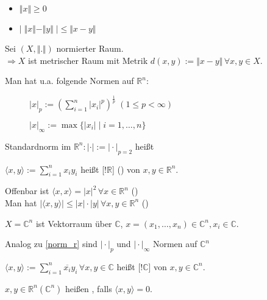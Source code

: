 \begin{conclusion}
	\begin{itemize}
		\item $\Vert x\Vert\ge 0$
		\item $\vert \; \Vert x\Vert - \Vert y\Vert \; \vert \leq \Vert x-y\Vert$
	\end{itemize}
\end{conclusion}

\begin{proposition}
	Sei $(X,\Vert .\Vert)$ normierter Raum.\\
	$\Rightarrow X$ ist metrischer Raum mit Metrik $d(x,y):=\Vert x - y \Vert\,\forall x,y\in X$.
\end{proposition}
\begin{example}
	\label{norm_r}
	Man hat u.a. folgende Normen auf $\mathbb{R}^n$:
	\begin{description}
		\item[] $\vert x\vert_p:=\left(\sum_{i=1}^n |x_i|^p\right)^\frac{1}{p}\;(1\le p<\infty)$
		\item[] $|x|_\infty :=\max\{|x_i| \mid i=1,\dots,n\}$
	\end{description}

	Standardnorm im $\mathbb{R}^n: \vert \cdot \vert:=\vert \cdot \vert_{p=2}$ heißt 
\end{example}
\begin{definition}[Skalarprodukt]
	$\langle x,y\rangle:=\sum_{i=1}^n x_i y_i$ heißt [!$\mathbb{R}$] () von $x,y\in\mathbb{R}^n$.
	
	Offenbar ist $\langle x,x\rangle = |x|^2\,\forall x\in\mathbb{R}^n$ ()\\
	Man hat $|\langle x,y\rangle | \le |x|\cdot |y|\,\forall x,y\in\mathbb{R}^n$ ()
\end{definition}
\begin{example}
	$X=\mathbb{C}^n$ ist Vektorraum über $\mathbb{C}$, $x=(x_1,\dotsc,x_n)\in\mathbb{C}^n, x_i\in\mathbb{C}$.
	
	Analog zu \ref{norm_r} sind $\vert\cdot\vert_p$ und $\vert\cdot\vert_\infty$ Normen auf $\mathbb{C}^n$
	
	$\langle x,y\rangle :=\sum_{i=1}^n \overline{x_i} y_i \,\forall x,y\in\mathbb{C}$ heißt [!$\mathbb{C}$] von $x,y\in\mathbb{C}^n$.
	
	$x,y\in\mathbb{R}^n (\mathbb{C}^n)$ heißen , falls $\langle x,y\rangle = 0$.
\end{example}
